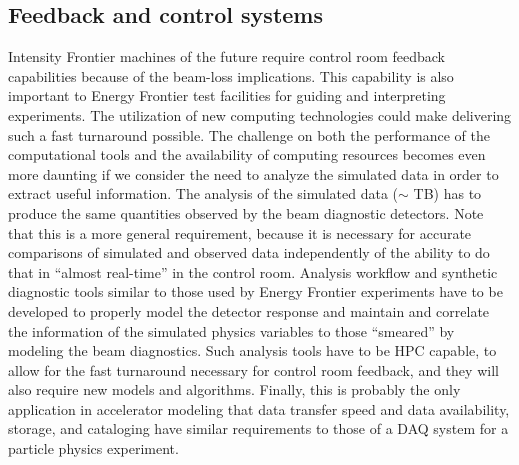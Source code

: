 \subsection{Feedback and control systems}
Intensity Frontier machines of the future require control room
feedback capabilities because of the beam-loss implications.  This 
capability is also important to Energy Frontier test
facilities for guiding and interpreting experiments.   The utilization of new computing technologies could make 
delivering  such a fast turnaround possible. The challenge on both the
performance of the computational tools and the availability of
computing resources becomes even  more daunting if we consider
the need to analyze the simulated data in order to extract useful
information.  The analysis of the simulated data ($\sim$ TB) has
to produce the same quantities observed by the beam diagnostic
detectors.  Note that this is a more general requirement, because
it is necessary for accurate comparisons of simulated and
observed data independently of the ability to do that in ``almost
real-time'' in the control room.  Analysis workflow
and synthetic diagnostic tools similar to those used by Energy Frontier
experiments have to be developed to properly model the detector
response and maintain and correlate the information of the
simulated physics variables to those ``smeared'' by modeling the
beam diagnostics.  Such analysis tools have to be HPC capable, to
allow for the fast turnaround necessary for control room
feedback, and they will also require new models
and algorithms.  Finally, this is probably the only application
in accelerator modeling that data transfer speed and data
availability, storage, and cataloging have similar requirements to
those of a  DAQ system for a particle physics experiment.


